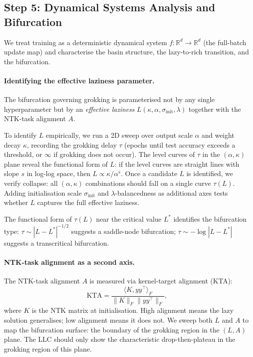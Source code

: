 \documentclass[11pt,a4paper]{article}
\begin{document}
\subsection{Step 5: Dynamical Systems Analysis and Bifurcation}\label{sec:dynamics}

We treat training as a deterministic dynamical system $f : \mathbb{R}^d \to \mathbb{R}^d$ (the full-batch update map) and characterise the basin structure, the lazy-to-rich transition, and the bifurcation.

\paragraph{Identifying the effective laziness parameter.} The bifurcation governing grokking is parameterised not by any single hyperparameter but by an \emph{effective laziness} $L(\kappa, \alpha, \sigma_{\mathrm{init}}, \lambda)$ together with the NTK-task alignment $A$.

To identify $L$ empirically, we run a 2D sweep over output scale $\alpha$ and weight decay $\kappa$, recording the grokking delay $\tau$ (epochs until test accuracy exceeds a threshold, or $\infty$ if grokking does not occur). The level curves of $\tau$ in the $(\alpha, \kappa)$ plane reveal the functional form of $L$: if the level curves are straight lines with slope $s$ in log-log space, then $L \propto \kappa / \alpha^s$. Once a candidate $L$ is identified, we verify collapse: all $(\alpha, \kappa)$ combinations should fall on a single curve $\tau(L)$. Adding initialisation scale $\sigma_{\mathrm{init}}$ and $\lambda$-balancedness as additional axes tests whether $L$ captures the full effective laziness.

The functional form of $\tau(L)$ near the critical value $L^*$ identifies the bifurcation type: $\tau \sim |L - L^*|^{-1/2}$ suggests a saddle-node bifurcation; $\tau \sim -\log|L - L^*|$ suggests a transcritical bifurcation.

\paragraph{NTK-task alignment as a second axis.} The NTK-task alignment $A$ is measured via kernel-target alignment (KTA):
\begin{equation}
    \mathrm{KTA} = \frac{\langle K, yy^\top \rangle_F}{\|K\|_F \|yy^\top\|_F},
\end{equation}
where $K$ is the NTK matrix at initialisation. High alignment means the lazy solution generalises; low alignment means it does not. We sweep both $L$ and $A$ to map the bifurcation surface: the boundary of the grokking region in the $(L, A)$ plane. The LLC should only show the characteristic drop-then-plateau in the grokking region of this plane.
\end{document}
